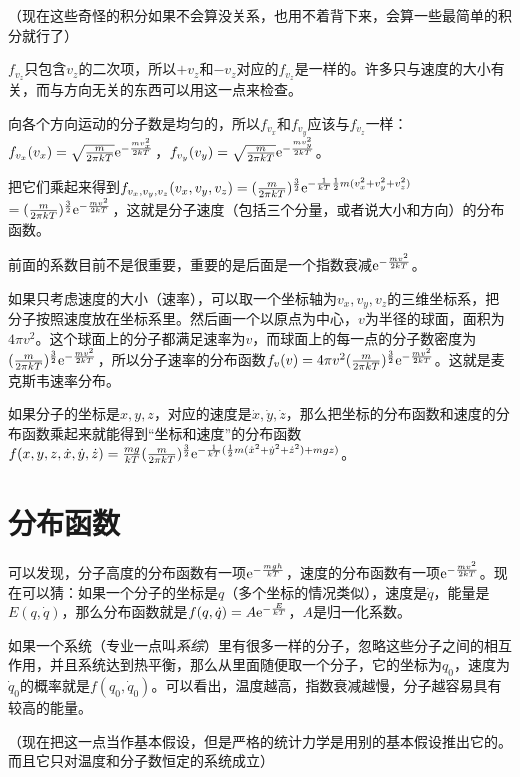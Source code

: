 （现在这些奇怪的积分如果不会算没关系，也用不着背下来，会算一些最简单的积分就行了）

$f_{v_z}$只包含$v_z$的二次项，所以$+v_z$和$-v_z$对应的$f_{v_z}$是一样的。许多只与速度的大小有关，而与方向无关的东西可以用这一点来检查。

向各个方向运动的分子数是均匀的，所以$f_{v_x}$和$f_{v_y}$应该与$f_{v_z}$一样：$f_{v_x}(v_x)=\sqrt{\frac{m}{2 \pi k T}} \mathrm{e}^{-\frac{m v_x^2}{2 k T}}$，$f_{v_y}(v_y)=\sqrt{\frac{m}{2 \pi k T}} \mathrm{e}^{-\frac{m v_y^2}{2 k T}}$。

把它们乘起来得到$f_{v_x,v_y,v_z}(v_x,v_y,v_z)=(\frac{m}{2 \pi k T})^\frac{3}{2} \mathrm{e}^{-\frac{1}{k T} \frac{1}{2} m (v_x^2+v_y^2+v_z^2)}$$=(\frac{m}{2 \pi k T})^\frac{3}{2} \mathrm{e}^{-\frac{m v^2}{2 k T}}$，这就是分子速度（包括三个分量，或者说大小和方向）的分布函数。

前面的系数目前不是很重要，重要的是后面是一个指数衰减$\mathrm{e}^{-\frac{m v^2}{2 k T}}$。

如果只考虑速度的大小（速率），可以取一个坐标轴为$v_x,v_y,v_z$的三维坐标系，把分子按照速度放在坐标系里。然后画一个以原点为中心，$v$为半径的球面，面积为$4 \pi v^2$。这个球面上的分子都满足速率为$v$，而球面上的每一点的分子数密度为$(\frac{m}{2 \pi k T})^\frac{3}{2} \mathrm{e}^{-\frac{m v^2}{2 k T}}$，所以分子速率的分布函数$f_v(v)=4 \pi v^2 (\frac{m}{2 \pi k T})^\frac{3}{2} \mathrm{e}^{-\frac{m v^2}{2 k T}}$。这就是麦克斯韦速率分布。

如果分子的坐标是$x,y,z$，对应的速度是$\dot x,\dot y,\dot z$，那么把坐标的分布函数和速度的分布函数乘起来就能得到“坐标和速度”的分布函数$f(x,y,z,\dot x,\dot y,\dot z)=\frac{m g}{k T} (\frac{m}{2 \pi k T})^\frac{3}{2} \mathrm{e}^{-\frac{1}{k T} (\frac{1}{2} m (\dot x^2+\dot y^2+\dot z^2)+m g z)}$。
\section{分布函数}
可以发现，分子高度的分布函数有一项$\mathrm{e}^{-\frac{m g h}{k T}}$，速度的分布函数有一项$\mathrm{e}^{-\frac{m v^2}{2 k T}}$。现在可以猜：如果一个分子的坐标是$q$（多个坐标的情况类似），速度是$\dot q$，能量是$E(q,\dot q)$，那么分布函数就是$f(q,\dot q)=A \mathrm{e}^{-\frac{E}{k T}}$，$A$是归一化系数。

如果一个系统（专业一点叫\emph{系综}）里有很多一样的分子，忽略这些分子之间的相互作用，并且系统达到热平衡，那么从里面随便取一个分子，它的坐标为$q_0$，速度为$\dot q_0$的概率就是$f(q_0,\dot q_0)$。可以看出，温度越高，指数衰减越慢，分子越容易具有较高的能量。

（现在把这一点当作基本假设，但是严格的统计力学是用别的基本假设推出它的。而且它只对温度和分子数恒定的系统成立）

